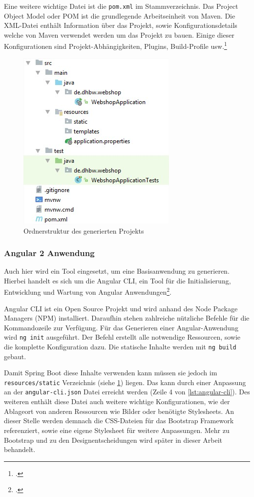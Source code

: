 Eine weitere wichtige Datei ist die \texttt{pom.xml} im Stammverzeichnis. Das Project Object Model oder \acs{POM} ist die grundlegende Arbeitseinheit von Maven. Die XML-Datei enthält Information über das Projekt, sowie Konfigurationsdetails welche von Maven verwendet werden um das Projekt zu bauen. Einige dieser Konfigurationen sind Projekt-Abhängigkeiten, Plugins, Build-Profile usw.\footcite[Vgl.][]{Foundation2017}

\begin{figure}[th!]
	\centering
	\includegraphics[width=0.5\linewidth]{bilder/kap7/init-project}
	\caption{Ordnerstruktur des generierten Projekts}
	\label{fig:init-project}
\end{figure}

\subsubsection{Angular 2 Anwendung}
Auch hier wird ein Tool eingesetzt, um eine Basisanwendung zu generieren. Hierbei handelt es sich um die Angular CLI, ein Tool für die Initialisierung, Entwicklung und Wartung von Angular Anwendungen\footcite[Vgl.][]{Arora2017}. 

Angular CLI ist ein Open Source Projekt und wird anhand des Node Package Managers (\acs{NPM}) installiert. Daraufhin stehen zahlreiche nützliche Befehle für die Kommandozeile zur Verfügung. Für das Generieren einer Angular-Anwendung wird \texttt{ng init} ausgeführt. Der Befehl erstellt alle notwendige Ressourcen, sowie die komplette Konfiguration dazu. Die statische Inhalte werden mit \texttt{ng build} gebaut. 

Damit Spring Boot diese Inhalte verwenden kann müssen sie jedoch im  \texttt{resources/static} Verzeichnis (siehe \cref{fig:init-project}) liegen. Das kann durch einer Anpassung an der \texttt{angular-cli.json} Datei erreicht werden (Zeile 4 von \cref{lst:angular-cli}). Des weiteren enthält diese Datei auch weitere wichtige Konfigurationen, wie der Ablageort von anderen Ressourcen wie Bilder oder benötigte Stylesheets. An dieser Stelle werden demnach die \acs{CSS}-Dateien für das Bootstrap Framework referenziert, sowie eine eigene Stylesheet für weitere Anpassungen. Mehr zu Bootstrap und zu den Designentscheidungen wird später in dieser Arbeit behandelt.
\\


